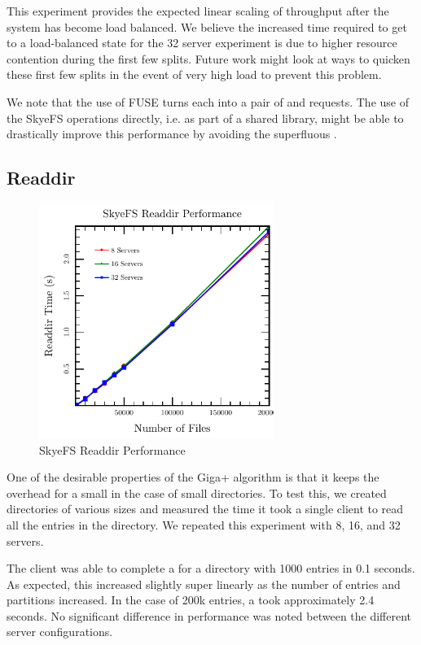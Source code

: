 \documentclass[onecolumn, 11pt, letterpaper]{article}
\begin{document}
This experiment provides the expected linear scaling of throughput after the
system has become load balanced.  We believe the increased time required to
get to a load-balanced state for the 32 server experiment is due to higher
resource contention during the first few splits.  Future work might look at
ways to quicken these first few splits in the event of very high load to
prevent this problem.

We note that the use of FUSE turns each  into a pair of
 and  requests.  The use of the SkyeFS operations
directly, i.e. as part of a shared library, might be able to drastically
improve this performance by avoiding the superfluous .

\subsection{Readdir}
\begin{figure}
\begin{center}
\includegraphics[width=3in]{graph-readdir}
\end{center}
\caption{SkyeFS Readdir Performance}
\end{figure}
One of the desirable properties of the Giga+ algorithm is that it keeps the
overhead for a  small in the case of small directories.  To test
this, we created directories of various sizes and measured the time it took a
single client to read all the entries in the directory.  We repeated this
experiment with 8, 16, and 32 servers.

The client was able to complete a  for a directory with 1000
entries in 0.1 seconds.  As expected, this increased slightly 
super linearly as the number of entries and partitions increased.  In the case of
200k entries, a  took approximately 2.4 seconds.  No significant
difference in performance was noted between the different server
configurations.
\end{document}

